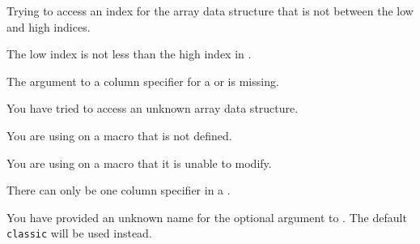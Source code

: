 \begin{plainlist}
    Trying to access an index for the array data structure that is not between
the low and high indices.


\item[]

    The low index is not less than the high index in \cmd{\newarray}.


\item[] 

    The argument to a column specifier for a  or 
is missing.



\item[]

    You have tried to access an unknown array data structure.


\item[]

    You are using \cmd{\patchcmd} on a macro that is not defined.

\item[]

    You are using \cmd{\patchcmd} on a macro that it is unable to
modify.



\item[]

    There can only be one column specifier in a \cmd{\multicolumn}.

\item[]

    You have provided an unknown name for the optional argument to
\cmd{\checkthelayout}. The default \texttt{classic} will be used instead.


\item[]


\end{plainlist}
